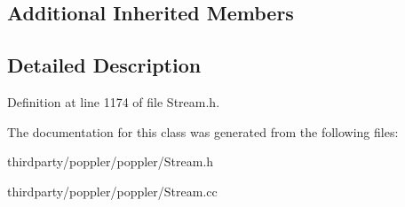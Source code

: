 \subsection*{Additional Inherited Members}


\subsection{Detailed Description}


Definition at line 1174 of file Stream.\+h.



The documentation for this class was generated from the following files\+:\begin{DoxyCompactItemize}
\item 
thirdparty/poppler/poppler/Stream.\+h\item 
thirdparty/poppler/poppler/Stream.\+cc\end{DoxyCompactItemize}

